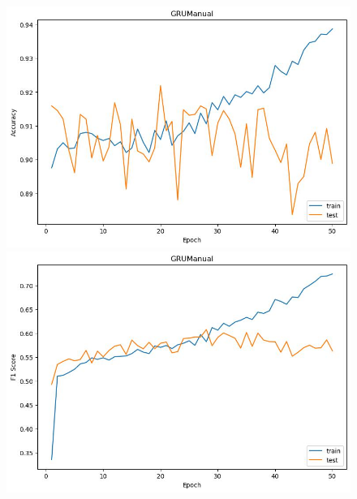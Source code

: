 \documentclass[UTF8]{article}
\begin{document}
\begin{figure}[h]
    \centering
    \begin{minipage}{.43\linewidth}
        \centering
        \includegraphics[width=\linewidth]{../figure/GRUManual_Accuracy.jpg}
    \end{minipage}
    \begin{minipage}{.43\linewidth}
        \centering
        \includegraphics[width=\linewidth]{../figure/GRUManual_F1.jpg}
    \end{minipage}


\end{figure}
\end{document}

